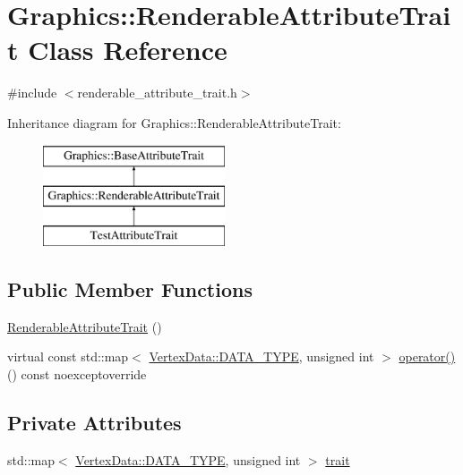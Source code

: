 \hypertarget{class_graphics_1_1_renderable_attribute_trait}{}\section{Graphics\+:\+:Renderable\+Attribute\+Trait Class Reference}
\label{class_graphics_1_1_renderable_attribute_trait}


{\ttfamily \#include $<$renderable\+\_\+attribute\+\_\+trait.\+h$>$}

Inheritance diagram for Graphics\+:\+:Renderable\+Attribute\+Trait\+:\begin{figure}[H]
\begin{center}
\leavevmode
\includegraphics[height=3.000000cm]{class_graphics_1_1_renderable_attribute_trait}
\end{center}
\end{figure}
\subsection*{Public Member Functions}
\begin{DoxyCompactItemize}
\item 
\hyperlink{class_graphics_1_1_renderable_attribute_trait_afae7775a218a12c44a77c9d2190fccd3}{Renderable\+Attribute\+Trait} ()
\item 
virtual const std\+::map$<$ \hyperlink{class_graphics_1_1_vertex_data_a50e88236939dc2a3ec4df7aeb728620e}{Vertex\+Data\+::\+D\+A\+T\+A\+\_\+\+T\+Y\+P\+E}, unsigned int $>$ \hyperlink{class_graphics_1_1_renderable_attribute_trait_a44401f624ace1dc71220e7064db92465}{operator()} () const noexceptoverride
\end{DoxyCompactItemize}
\subsection*{Private Attributes}
\begin{DoxyCompactItemize}
\item 
std\+::map$<$ \hyperlink{class_graphics_1_1_vertex_data_a50e88236939dc2a3ec4df7aeb728620e}{Vertex\+Data\+::\+D\+A\+T\+A\+\_\+\+T\+Y\+P\+E}, unsigned int $>$ \hyperlink{class_graphics_1_1_renderable_attribute_trait_aa20fd62c99d1635eabe9a7fd73a67b32}{trait}
\end{DoxyCompactItemize}


